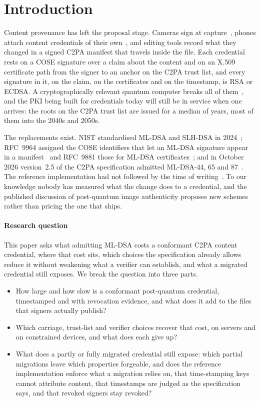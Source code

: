 \section{Introduction}
\label{sec:intro}

Content provenance has left the proposal stage. Cameras sign at
capture~\cite{cai2023leica,sony2024c2pa}, phones attach content credentials of
their own~\cite{samsung2025s25,google2025pixel}, and editing tools record what
they changed in a signed C2PA manifest that travels inside the file. Each
credential rests on a COSE signature over a claim about the content and on an
X.509 certificate path from the signer to an anchor on the C2PA trust list,
and every signature in it, on the claim, on the certificates and on the
timestamp, is RSA or ECDSA. A cryptographically relevant quantum computer
breaks all of them~\cite{shor1997}, and the PKI being built for credentials
today will still be in service when one arrives: the roots on the C2PA trust list are issued for
a median of \NtlRootYearsMed{} years, most of them into the 2040s and 2050s.

The replacements exist. NIST standardised ML-DSA and SLH-DSA in
2024~\cite{fips204,fips205}; RFC~9964 assigned the COSE identifiers that let an
ML-DSA signature appear in a manifest~\cite{rfc9964} and RFC~9881 those for
ML-DSA certificates~\cite{rfc9881}; and in October 2026 version~2.5 of the
C2PA specification admitted ML-DSA-44, 65 and 87~\cite{c2pa25}. The reference
implementation had not followed by the time of writing~\cite{c2pars}. To our
knowledge nobody has measured what the change does to a credential, and the published
discussion of post-quantum image authenticity proposes new
schemes~\cite{iavich2025pqveritas,alkhatib2025deepfake} rather than pricing the
one that ships.

\paragraph{Research question}
This paper asks what admitting ML-DSA costs a conformant C2PA content
credential, where that cost sits, which choices the specification already
allows reduce it without weakening what a verifier can establish, and what a
migrated credential still exposes. We break the question into three parts.
\begin{itemize}
\item[\textbf{RQ1}] How large and how slow is a conformant post-quantum
credential, timestamped and with revocation evidence, and what does it add to
the files that signers actually publish?
\item[\textbf{RQ2}] Which carriage, trust-list and verifier choices recover
that cost, on servers and on constrained devices, and what does each give up?
\item[\textbf{RQ3}] What does a partly or fully migrated credential still
expose: which partial migrations leave which properties forgeable, and does the
reference implementation enforce what a migration relies on, that time-stamping keys cannot attribute content, that
timestamps are judged as the specification says, and that revoked signers stay
revoked?
\end{itemize}

